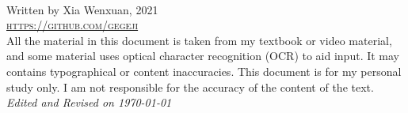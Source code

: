 \documentclass[11pt,fleqn, twoside, openany]{book} %
\begin{document}
\SetEndCharOfAlgoLine{}




\newpage
~\vfill
\thispagestyle{empty}

\noindent Written by Xia Wenxuan, 2021\\


\noindent \textsc{\url{https://github.com/gegeji}}\\ %


\noindent All the material in this document is taken from my textbook or video material, and some material uses optical character recognition (OCR) to aid input. It may contains typographical or content inaccuracies. This document is for my personal study only. I am not responsible for the accuracy of the content of the text.\\

\noindent \textit{Edited and Revised on \today} %

\end{document}
